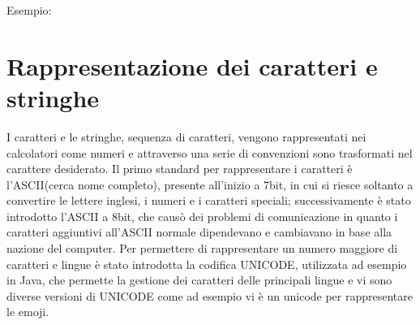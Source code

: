 Esempio:

\section{Rappresentazione dei caratteri e stringhe}
I caratteri e le stringhe, sequenza di caratteri, vengono rappresentati nei calcolatori
come numeri e attraverso una serie di convenzioni sono trasformati nel carattere desiderato.\newline
Il primo standard per rappresentare i caratteri è l'ASCII(cerca nome completo),
presente all'inizio a 7bit, in cui si riesce soltanto a convertire le lettere inglesi,
i numeri e i caratteri speciali; successivamente è stato introdotto l'ASCII a 8bit,
che causò dei problemi di comunicazione in quanto i caratteri aggiuntivi all'ASCII normale
dipendevano e cambiavano in base alla nazione del computer.
Per permettere di rappresentare un numero maggiore di caratteri e lingue è stato introdotta
la codifica UNICODE, utilizzata ad esempio in Java, che permette la gestione dei caratteri
delle principali lingue e vi sono diverse versioni di UNICODE come ad esempio vi è
un unicode per rappresentare le emoji.

